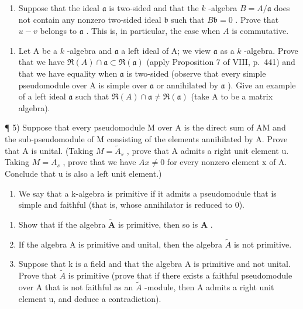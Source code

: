 \begin{enumerate}
\def\labelenumi{\alph{enumi})}
\setcounter{enumi}{1}
\tightlist
\item
  Suppose that the ideal \(\mathfrak{a}\) is two-sided and that the \(k\) -algebra \(B = A / \mathfrak{a}\) does not contain any nonzero two-sided ideal \(\mathfrak{b}\) such that \(B\mathfrak{b} = 0\) . Prove that \(u - v\) belongs to \(\mathfrak{a}\) . This is, in particular, the case when \(A\) is commutative.
\end{enumerate}

\begin{enumerate}
\def\labelenumi{\arabic{enumi})}
\setcounter{enumi}{3}
\tightlist
\item
  Let A be a \(k\) -algebra and \(\mathfrak{a}\) a left ideal of A; we view \(\mathfrak{a}\) as a \(k\) -algebra. Prove that we have \(\Re(A) \cap \mathfrak{a} \subset \Re(\mathfrak{a})\) (apply Proposition 7 of VIII, p.~441) and that we have equality when \(\mathfrak{a}\) is two-sided (observe that every simple pseudomodule over A is simple over \(\mathfrak{a}\) or annihilated by \(\mathfrak{a}\) ). Give an example of a left ideal \(\mathfrak{a}\) such that \(\Re(A) \cap \mathfrak{a} \neq \Re(\mathfrak{a})\) (take A to be a matrix algebra).
\end{enumerate}

¶ 5) Suppose that every pseudomodule M over A is the direct sum of AM and the sub-pseudomodule of M consisting of the elements annihilated by A. Prove that A is unital. (Taking \(M = \widetilde{A}_{s}\) , prove that A admits a right unit element u. Taking \(M = A_{s}\) , prove that we have \(Ax \neq 0\) for every nonzero element x of A. Conclude that u is also a left unit element.)

\begin{enumerate}
\def\labelenumi{\arabic{enumi})}
\setcounter{enumi}{5}
\tightlist
\item
  We say that a k-algebra is primitive if it admits a pseudomodule that is simple and faithful (that is, whose annihilator is reduced to 0).
\end{enumerate}

\begin{enumerate}
\def\labelenumi{\alph{enumi})}
\item
  Show that if the algebra \(\tilde{\mathbf{A}}\) is primitive, then so is \(\mathbf{A}\) .
\item
  If the algebra A is primitive and unital, then the algebra \(\widetilde{A}\) is not primitive.
\item
  Suppose that k is a field and that the algebra A is primitive and not unital. Prove that \(\widetilde{A}\) is primitive (prove that if there exists a faithful pseudomodule over A that is not faithful as an \(\widetilde{A}\) -module, then A admits a right unit element u, and deduce a contradiction).
\end{enumerate}

